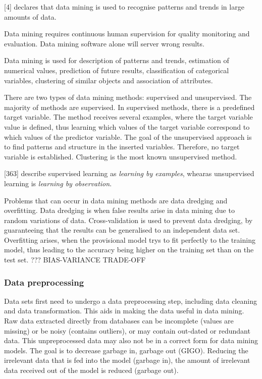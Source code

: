\textcite{DataMiningAndPredictiveAnalytics}[4] declares that data mining is used to recognise patterns and trends in large amounts of data.

Data mining requires continuous human supervision for quality monitoring and evaluation. Data mining software alone will server wrong results.

Data mining is used for description of patterns and trends, estimation of numerical values, prediction of future results, classification of categorical variables, clustering of similar objects and association of attributes.


There are two types of data mining methods: supervised and unsupervised.
The majority of methods are supervised. In supervised methods, there is a predefined target variable. The method receives several examples, where the target variable value is defined, thus learning which values of the target variable correspond to which values of the predictor variable.
The goal of the unsupervised approach is to find patterns and structure in the inserted variables. Therefore, no target variable is established. Clustering is the most known unsupervised method.

\textcite{han2011data}[363] describe supervised learning as \textit{learning by examples}, whearas unsupervised learning is \textit{learning by observation}.

Problems that can occur in data mining methods are data dredging and overfitting. Data dredging is when false results arise in data mining due to random variations of data. Cross-validation is used to prevent data dredging, by guaranteeing that the results can be generalised to an independent data set. %
Overfitting arises, when the provisional model trys to fit perfectly to the training model, thus leading to the accuracy being higher on the training set than on the test set. ???
BIAS-VARIANCE  TRADE-OFF


\subsubsection{Data preprocessing}
Data sets first need to undergo a data preprocessing step, including data cleaning and data transformation. This aids in making the data useful in data mining. Raw data extracted directly from databases can be incomplete (values are missing) or be noisy (contains outliers), or may contain out-dated or redundant data. This unpreprocessed data may also not be in a correct form for data mining models. The goal is to decrease garbage in, garbage out (GIGO). Reducing the irrelevant data that is fed into the model (garbage in), the amount of irrelevant data received out of the model is reduced (garbage out).

